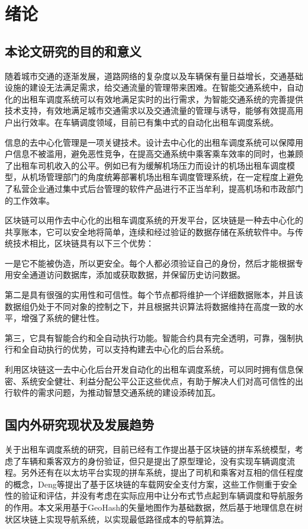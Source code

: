 \chapter{绪论}
\section{本论文研究的目的和意义}

随着城市交通的逐渐发展，道路网络的复杂度以及车辆保有量日益增长，交通基础设施的建设无法满足需求，给交通流量的管理带来困难。在智能交通系统中，自动化的出租车调度系统可以有效地满足实时的出行需求，为智能交通系统的完善提供技术支持，有效地满足城市交通需求以及交通流量的管理与诱导，能够有效提高用户出行效率。在车辆调度领域，目前已有集中式的自动化出租车调度系统。\par
信息的去中心化管理是一项关键技术。设计去中心化的出租车调度系统可以保障用户信息不被滥用，避免恶性竞争，在提高交通系统中乘客乘车效率的同时，也兼顾了出租车司机收入的公平。例如已有为缓解机场压力而设计的机场出租车调度模型，从机场管理部门的角度统筹部署机场出租车调度管理系统，在一定程度上避免了私营企业通过集中式后台管理的软件产品进行不正当牟利，提高机场和市政部门的工作效率。\par
区块链可以用作去中心化的出租车调度系统的开发平台，区块链是一种去中心化的共享账本，它可以安全地将简单，连续和经过验证的数据存储在系统软件中。与传统技术相比，区块链具有以下三个优势：\par
一是它不能被伪造，所以更安全。每个人都必须验证自己的身份，然后才能根据专用安全通道访问数据库，添加或获取数据，并保留历史访问数据。\par
第二是具有很强的实用性和可信性。每个节点都将维护一个详细数据账本，并且该数据组仍处于不同对象的控制之下，并且根据共识算法将数据维持在高度一致的水平，增强了系统的健壮性。\par
第三，它具有智能合约和全自动执行功能。智能合约具有完全透明，可靠，强制执行和全自动执行的优势，可以支持构建去中心化的后台系统。\par
利用区块链这一去中心化后台开发自动化的出租车调度系统，可以同时拥有信息保密、系统安全健壮、利益分配公平公正这些优点，有助于解决人们对高可信性的出行软件的需求问题，为推动智慧交通系统的建设添砖加瓦。


\section{国内外研究现状及发展趋势}
关于出租车调度系统的研究，目前已经有工作提出基于区块链的拼车系统模型，考虑了车辆和乘客双方的身份验证，但只是提出了原型理论，没有实现车辆调度流程。另外还有在以太坊平台实现的拼车系统，提出了司机和乘客对互相的信任程度的概念，Deng等提出了基于区块链的车载网安全支付方案，这些工作侧重于安全性的验证和评估，并没有考虑在实际应用中让分布式节点起到车辆调度和导航服务的作用。本文采用基于GeoHash的矢量地图作为基础数据，然后基于地理信息在树状区块链上实现导航系统，以实现最低路径成本的导航算法。\par

